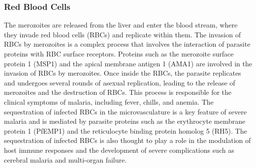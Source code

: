 \documentclass[twoside]{article}
\begin{document}
\begin{multicols}{2}
   
    \subsubsection*{Red Blood Cells}
    The merozoites are released from the liver and enter the blood stream, where they invade red blood cells (RBCs) and replicate
    within them. The invasion of RBCs by merozoites is a complex process that involves the interaction of parasite proteins with
    RBC surface receptors. Proteins such as the merozoite surface protein 1 (MSP1) and the apical membrane antigen 1 (AMA1) are
    involved in the invasion of RBCs by merozoites. Once inside the RBCs, the parasite replicates and undergoes several rounds of
    asexual replication, leading to the release of merozoites and the destruction of RBCs. This process is responsible for the
    clinical symptoms of malaria, including fever, chills, and anemia. The sequestration of infected RBCs in the microvasculature
    is a key feature of severe malaria and is mediated by parasite proteins such as the erythrocyte membrane protein 1 (PfEMP1)
    and the reticulocyte binding protein homolog 5 (RH5).
    The sequestration of infected RBCs is also thought to play a role in the modulation of host immune responses and the development of severe
    complications such as cerebral malaria and multi-organ failure. 


\end{multicols}
\end{document}
